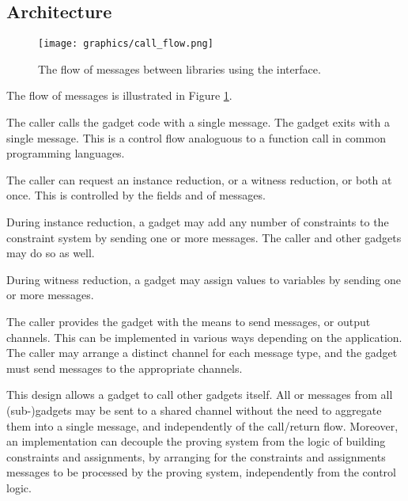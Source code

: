\subsection{Architecture}
\label{sec:architecture}

\begin{figure}[!h]
	\centering
	\texttt{[image: graphics/call\_flow.png]}
	\caption{The flow of messages between libraries using the interface.}
	\label{fig:flow}
\end{figure}

	The flow of messages is illustrated in Figure \ref{fig:flow}.

	The caller calls the gadget code with a single  message.
	The gadget exits with a single  message.
	This is a control flow analoguous to a function call in common programming languages.

	The caller can request an instance reduction, or a witness reduction, or both at once.
	This is controlled by the fields  and  of  messages.

	During instance reduction,
	a gadget may add any number of constraints to the constraint system
	by sending one or more  messages.
	The caller and other gadgets may do so as well.

	During witness reduction,
	a gadget may assign values to variables
	by sending one or more  messages.

	The caller provides the gadget with the means to send messages,
	or output channels.	This can be implemented in various ways depending
	on the application.
	The caller may arrange a distinct channel for each message type,
	and the gadget must send messages to the appropriate channels.

	This design allows a gadget to call other gadgets itself.
	All  or  messages
	from all (sub-)gadgets may be sent to a shared channel
	without the need to aggregate them into a single message,
	and independently of the call/return flow.
	Moreover, an implementation can decouple the proving system
	from the logic of building constraints and assignments,
	by arranging for the constraints and assignments messages
	to be processed by the proving system, independently from the control logic.

